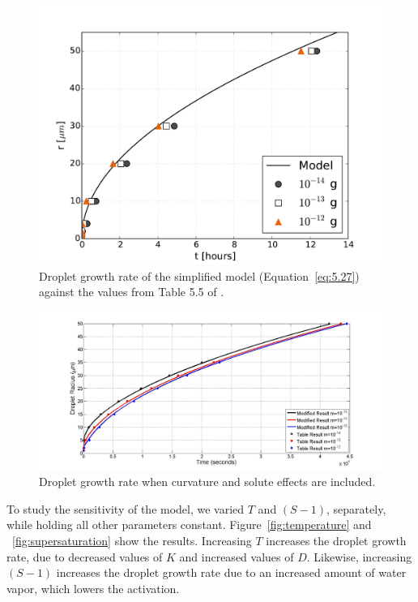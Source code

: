 \documentclass[]{article}
\begin{document}
\begin{figure}[h]
    \centering
    \includegraphics[width=\textwidth]{r_t.pdf}
    \caption{Droplet growth rate of the simplified model (Equation~\eqref{eq:5.27}) against the values from Table 5.5 of \cite{Curry}.}
    \label{fig:r_t}
\end{figure}

\begin{figure}[h]
    \centering
    \includegraphics[width=\textwidth]{r_t_modified.jpg}
    \caption{Droplet growth rate when curvature and solute effects are included.}
    \label{fig:r_t_modified}
\end{figure}


To study the sensitivity of the model, we varied $T$ and $(S - 1)$, separately,
while holding all other parameters constant. Figure~\ref{fig:temperature} and
~\ref{fig:supersaturation} show the results.  Increasing $T$ increases the
droplet growth rate, due to decreased values of $K$ and increased values of
$D$.  Likewise, increasing $(S - 1)$ increases the droplet growth rate due to
an increased amount of water vapor, which lowers the activation.
\end{document}
